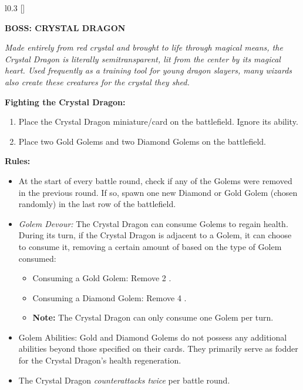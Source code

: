 \begin{wrapfigure}{l}{0.3\textwidth}
  \raisebox{0pt}[\dimexpr{}\baselineskip\relax]{}
\end{wrapfigure}
{
  \textbf{\MakeUppercase{Boss: Crystal Dragon}}

  \medskip

  \textit{Made entirely from red crystal and brought to life through magical means, the Crystal Dragon is literally semitransparent, lit from the center by its magical heart.
    Used frequently as a training tool for young dragon slayers, many wizards also create these creatures for the crystal they shed.
  }

  \medskip

  \textbf{Fighting the Crystal Dragon:}
  \begin{enumerate}
    \item Place the Crystal Dragon miniature/card on the battlefield.
      Ignore its ability.
    \item Place two Gold Golems and two Diamond Golems on the battlefield.
  \end{enumerate}

  \medskip

  \textbf{Rules:}
  \begin{itemize}
    \item At the start of every battle round, check if any of the Golems were removed in the previous round.
      If so, spawn one new Diamond or Gold Golem (chosen randomly) in the last row of the battlefield.
    \item \textit{Golem Devour:} The Crystal Dragon can consume Golems to regain health.
      During its turn, if the Crystal Dragon is adjacent to a Golem, it can choose to consume it, removing a certain amount of  based on the type of Golem consumed:
      \begin{itemize}
        \item Consuming a Gold Golem: Remove 2 .
        \item Consuming a Diamond Golem: Remove 4 .
        \item[] \textbf{Note:} The Crystal Dragon can only consume one Golem per turn.
      \end{itemize}
    \item Golem Abilities: Gold and Diamond Golems do not possess any additional abilities beyond those specified on their cards.
      They primarily serve as fodder for the Crystal Dragon's health regeneration.
    \item The Crystal Dragon \textit{counterattacks twice} per battle round.
  \end{itemize}
}

